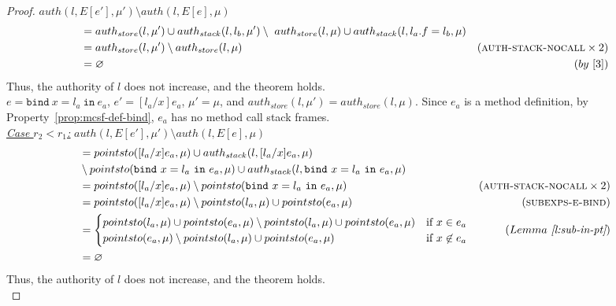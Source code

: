 \documentclass{llncs}
\newcommand{\keywadj}[1]{\mathtt{#1}}
\newcommand{\keyw}[1]{\keywadj{#1}~}
\begin{document}
\begin{proof}
\noindent$auth(l, E[e'], \mu') \setminus auth(l, E[e], \mu)$
\vspace{-7pt}
\begin{align*}
&= auth_{store}(l, \mu') \cup auth_{stack}(l, l_b, \mu') \setminus~auth_{store}(l, \mu) \cup auth_{stack}(l, l_a.f = l_b, \mu)\\
&= auth_{store}(l, \mu') \setminus auth_{store}(l, \mu) & (\textsc{auth-stack-nocall} \times 2)\\
&= \varnothing & (by~[3])
\end{align*}
Thus, the authority of $l$ does not increase, and the theorem holds.\\


\noindent{}
$e = \keyw{bind} x = l_a~\keyw{in} e_a$, $e' = [l_a/x]e_a$, $\mu' = \mu$, and $auth_{store}(l, \mu') = auth_{store}(l, \mu)$. Since $e_a$ is a method definition, by Property~\ref{prop:mcsf-def-bind}, $e_a$ has no method call stack frames.\\

\noindent\underline{\underline{\textit{Case $r_2 < r_1$:}}}
$auth(l, E[e'], \mu') \setminus auth(l, E[e], \mu)$
\vspace{-7pt}
\begin{align*}
&= pointsto([l_a/x]e_a, \mu) \cup auth_{stack}(l, [l_a/x]e_a, \mu)\\
&\setminus pointsto(\keyw{bind} x = l_a~\keyw{in} e_a, \mu) \cup auth_{stack}(l, \keyw{bind} x = l_a~\keyw{in} e_a, \mu)\\
&= pointsto([l_a/x]e_a, \mu) \setminus pointsto(\keyw{bind} x = l_a~\keyw{in} e_a, \mu) & (\textsc{auth-stack-nocall} \times 2)\\
&= pointsto([l_a/x]e_a, \mu) \setminus pointsto(l_a, \mu) \cup pointsto(e_a, \mu) & (\textsc{subexps-e-bind})\\
&=
\begin{cases}
    pointsto(l_a, \mu) \cup pointsto(e_a, \mu) \setminus pointsto(l_a, \mu) \cup pointsto(e_a, \mu) & \text{if } x \in e_a\\
    pointsto(e_a, \mu) \setminus pointsto(l_a, \mu) \cup pointsto(e_a, \mu) & \text{if } x \not\in e_a
\end{cases} & (Lemma~\textit{\ref{l:sub-in-pt}})\\
&= \varnothing
\end{align*}
Thus, the authority of $l$ does not increase, and the theorem holds.\\


\end{proof}
\end{document}
